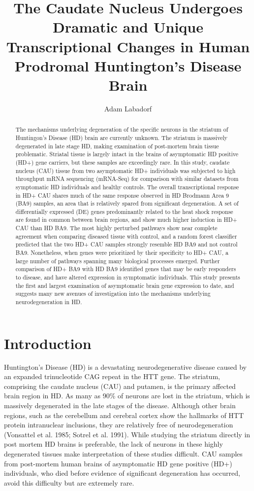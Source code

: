 \documentclass[fleqn,10pt,table]{wlscirep}
\title{The Caudate Nucleus Undergoes Dramatic and Unique Transcriptional Changes in Human Prodromal Huntington's Disease Brain}
\author{Adam Labadorf}
\begin{document}
\flushbottom
\maketitle

\thispagestyle{empty}

\begin{abstract}
The mechanisms underlying degeneration of the specific neurons in the striatum of Huntingon's Disease (HD) brain are currently unknown.
The striatum is massively degenerated in late stage HD, making examination of post-mortem brain tissue problematic.
Striatal tissue is largely intact in the brains of asymptomatic HD positive (HD+) gene carriers, but these samples are exceedingly rare.
In this study, caudate nucleus (CAU) tissue from two asymptomatic HD+ individuals was subjected to high throughput mRNA sequencing (mRNA-Seq) for comparison with similar datasets from symptomatic HD individuals and healthy controls.
The overall transcriptional response in HD+ CAU shares much of the same response observed in HD Brodmann Area 9 (BA9) samples, an area that is relatively spared from significant degeneration.
A set of differentially expressed (DE) genes predominantly related to the heat shock response are found in common between brain regions, and show much higher induction in HD+ CAU than HD BA9.
The most highly perturbed pathways show near complete agreement when comparing diseased tissue with control, and a random forest classifier predicted that the two HD+ CAU samples strongly resemble HD BA9 and not control BA9.
Nonetheless, when genes were prioritized by their specificity to HD+ CAU, a large number of pathways spanning many biological processes emerged.
Further comparison of HD+ BA9 with HD BA9 identified genes that may be early responders to disease, and have altered expression in symptomatic individuals.
This study presents the first and largest examination of asymptomatic brain gene expression to date, and suggests many new avenues of investigation into the mechanisms underlying neurodegeneration in HD.
\end{abstract}

\section{Introduction}
Huntington’s Disease (HD) is a devastating neurodegenerative disease caused by an expanded trinucleotide CAG repeat in the HTT gene.
The striatum, comprising the caudate nucleus (CAU) and putamen, is the primary affected brain region in HD.
As many as 90\% of neurons are lost in the striatum, which is massively degenerated in the late stages of the disease.
Although other brain regions, such as the cerebellum and cerebral cortex show the hallmarks of HTT protein intranuclear inclusions, they are relatively free of neurodegeneration (Vonsattel et al. 1985; Sotrel et al. 1991).
While studying the striatum directly in post mortem HD brains is preferable, the lack of neurons in these highly degenerated tissues make interpretation of these studies difficult.
CAU samples from post-mortem human brains of asymptomatic HD gene positive (HD+) individuals, who died before evidence of significant degeneration has occurred, avoid this difficulty but are extremely rare.
\end{document}
